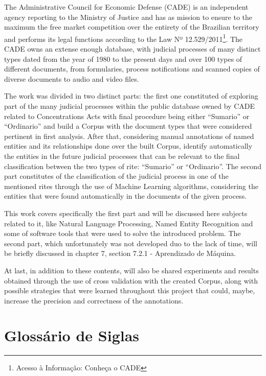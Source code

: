 \documentclass[11pt]{report}
\newcommand{\quotes}[1]{``#1''}
\begin{document}
\indent\indent The Administrative Council for Economic Defense (CADE) is an independent agency reporting to the Ministry of Justice and has as mission to ensure to the maximum the free
market competition over the entirety of the Brazilian territory and performs its legal functions according to the Law Nº 12.529/2011\footnote[2]{Acesso à Informação: Conheça o CADE}.
The CADE owns an extense enough database, with judicial processes of many distinct types dated from the year of 1980 to the present days and over 100 types of different documents,
from formularies, process notifications and scanned copies of diverse documents to audio and video files.

The work was divided in two distinct parts: the first one constituted of exploring part of the many judicial processes within the public database owned by CADE related to Concentrations
Acts with final procedure being either \quotes{Sumario} or \quotes{Ordinario} and build a Corpus with the document types that were considered pertinent in first analysis. After that,
considering manual annotations of named entities and its relationships done over the built Corpus, identify automatically the entities in the future judicial processes that can be relevant
to the final classification between the two types of rite: \quotes{Sumario} or \quotes{Ordinario}. The second part constitutes of the classification of the judicial process in one of
the mentioned rites through the use of Machine Learning algorithms, considering the entities that were found automatically in the documents of the given process.

This work covers specifically the first part and will be discussed here subjects related to it, like Natural Language Processing, Named Entity Recognition and some of software tools that
were used to solve the introduced problem. The second part, which unfortunately was not developed duo to the lack of time, will be briefly discussed in chapter 7,
section 7.2.1 - Aprendizado de Máquina.

At last, in addition to these contents, will also be shared experiments and results obtained through the use of cross validation with the created Corpus, along with possible strategies that
were learned throughout this project that could, maybe, increase the precision and correctness of the annotations.

\pagebreak
\thispagestyle{empty}
\chapter*{Glossário de Siglas}
\end{document}
